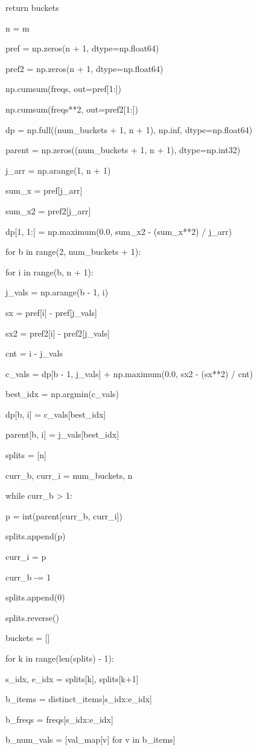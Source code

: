 \documentclass[11pt,a4paper]{article}
\begin{document}
return buckets


n = m

pref = np.zeros(n + 1, dtype=np.float64)

pref2 = np.zeros(n + 1, dtype=np.float64)

np.cumsum(freqs, out=pref[1:])

np.cumsum(freqs**2, out=pref2[1:])


dp = np.full((num\_buckets + 1, n + 1), np.inf, dtype=np.float64)

parent = np.zeros((num\_buckets + 1, n + 1), dtype=np.int32)


j\_arr = np.arange(1, n + 1)

sum\_x = pref[j\_arr]

sum\_x2 = pref2[j\_arr]

dp[1, 1:] = np.maximum(0.0, sum\_x2 - (sum\_x**2) / j\_arr)


for b in range(2, num\_buckets + 1):

for i in range(b, n + 1):

j\_vals = np.arange(b - 1, i)

sx = pref[i] - pref[j\_vals]

sx2 = pref2[i] - pref2[j\_vals]

cnt = i - j\_vals

c\_vals = dp[b - 1, j\_vals] + np.maximum(0.0, sx2 - (sx**2) / cnt)

best\_idx = np.argmin(c\_vals)

dp[b, i] = c\_vals[best\_idx]

parent[b, i] = j\_vals[best\_idx]


splits = [n]

curr\_b, curr\_i = num\_buckets, n

while curr\_b > 1:

p = int(parent[curr\_b, curr\_i])

splits.append(p)

curr\_i = p

curr\_b -= 1

splits.append(0)

splits.reverse()


buckets = []

for k in range(len(splits) - 1):

s\_idx, e\_idx = splits[k], splits[k+1]

b\_items = distinct\_items[s\_idx:e\_idx]

b\_freqs = freqs[s\_idx:e\_idx]

b\_num\_vals = [val\_map[v] for v in b\_items]
\end{document}
